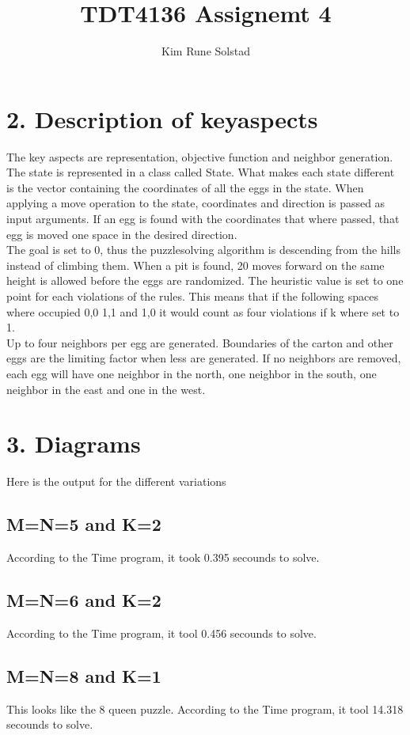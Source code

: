 \documentclass[a4paper]{article}
\title{TDT4136 Assignemt 4}
\author{Kim Rune Solstad}
\begin{document}
\maketitle
\section*{2. Description of keyaspects}
The key aspects are representation, objective function and neighbor generation. The state is represented in a class called State. What makes each state different is the vector containing the coordinates of all the eggs in the state. When applying a move operation to the state, coordinates and direction is passed as input arguments. If an egg is found with the coordinates that where passed, that egg is moved one space in the desired direction. 
\\
The goal is set to 0, thus the puzzlesolving algorithm is descending from the hills instead of climbing them. When a pit is found, 20 moves forward on the same height is allowed before the eggs are randomized. The heuristic value is set to one point for each violations of the rules. This means that if the following spaces where occupied 0,0 1,1 and 1,0 it would count as four violations if k where set to 1.
\\
Up to four neighbors per egg are generated. Boundaries of the carton and other eggs are the limiting factor when less are generated. If no neighbors are removed, each egg will have one neighbor in the north, one neighbor in the south, one neighbor in the east and one in the west. 
\section*{3. Diagrams}
Here is the output for the different variations
\subsection*{M=N=5 and K=2}
According to the Time program, it took 0.395 secounds to solve.

\subsection*{M=N=6 and K=2}
According to the Time program, it tool 0.456 secounds to solve. 

\subsection*{M=N=8 and K=1}
This looks like the 8 queen puzzle.
According to the Time program, it tool 14.318 secounds to solve. 

\end{document}
